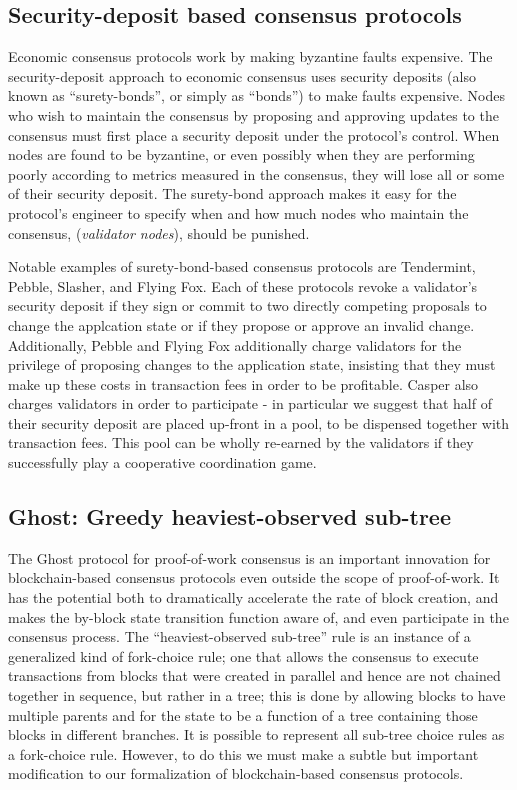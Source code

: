 \documentclass[11pt,a4paper]{article}
\begin{document}
\subsection{Security-deposit based consensus protocols}

Economic consensus protocols work by making byzantine faults expensive. The security-deposit approach to economic consensus uses security deposits (also known as ``surety-bonds'', or simply as ``bonds'') to make faults expensive. Nodes who wish to maintain the consensus by proposing and approving updates to the consensus must first place a security deposit under the protocol's control. When nodes are found to be byzantine, or even possibly when they are performing poorly according to metrics measured in the consensus, they will lose all or some of their security deposit. The surety-bond approach makes it easy for the protocol's engineer to specify when and how much nodes who maintain the consensus, (\emph{validator nodes}), should be punished.

Notable examples of surety-bond-based consensus protocols are Tendermint\cite{TM}, Pebble\cite{Pebble}, Slasher\cite{Slasher}, and Flying Fox\cite{FlyingFox}. Each of these protocols revoke a validator's security deposit if they sign or commit to two directly competing proposals to change the applcation state or if they propose or approve an invalid change. Additionally, Pebble and Flying Fox additionally charge validators for the privilege of proposing changes to the application state, insisting that they must make up these costs in transaction fees in order to be profitable. Casper also charges validators in order to participate - in particular we suggest that half of their security deposit are placed up-front in a pool, to be dispensed together with transaction fees. This pool can be wholly re-earned by the validators if they successfully play a cooperative coordination game.

\subsection{Ghost: Greedy heaviest-observed sub-tree}

The Ghost protocol for proof-of-work consensus\cite{GHOST} is an important innovation for blockchain-based consensus protocols even outside the scope of proof-of-work. It has the potential both to dramatically accelerate the rate of block creation, and makes the by-block state transition function aware of, and even participate in the consensus process. The ``heaviest-observed sub-tree'' rule is an instance of a generalized kind of fork-choice rule; one that allows the consensus to execute transactions from blocks that were created in parallel and hence are not chained together in sequence, but rather in a tree; this is done by allowing blocks to have multiple parents and for the state to be a function of a tree containing those blocks in different branches. It is possible to represent all sub-tree choice rules as a fork-choice rule. However, to do this we must make a subtle but important modification to our formalization of blockchain-based consensus protocols.
\end{document}
